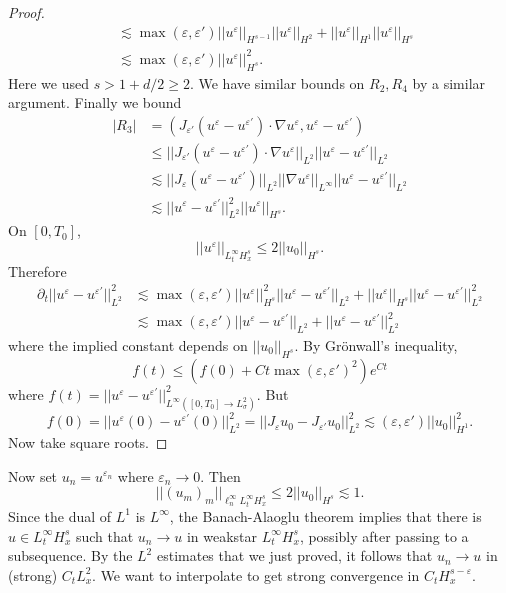 \documentclass[12pt]{book}
\theoremstyle{definition}
\begin{document}
\begin{proof}
\begin{align*}
&\lesssim \max(\varepsilon, \varepsilon') ||u^\varepsilon||_{H^{s-1}} ||u^\varepsilon||_{H^2} + ||u^\varepsilon||_{H^1} ||u^\varepsilon||_{H^s}\\
&\lesssim \max(\varepsilon, \varepsilon') ||u^\varepsilon||_{H^s}^2.
\end{align*}
Here we used $s > 1 + d/2 \geq 2$.
We have similar bounds on $R_2, R_4$ by a similar argument.
Finally we bound
\begin{align*}
|R_3| &= (J_{\varepsilon'}(u^\varepsilon - u^{\varepsilon'})\cdot \nabla u^\varepsilon,u^\varepsilon - u^{\varepsilon'}) \\
&\leq ||J_{\varepsilon'}(u^\varepsilon - u^{\varepsilon'})\cdot \nabla u^\varepsilon||_{L^2} ||u^\varepsilon - u^{\varepsilon'}||_{L^2}\\
&\lesssim ||J_\varepsilon(u^\varepsilon - u^{\varepsilon'})||_{L^2} ||\nabla u^\varepsilon||_{L^\infty} ||u^\varepsilon - u^{\varepsilon'}||_{L^2}\\
&\lesssim ||u^\varepsilon - u^{\varepsilon'}||_{L^2}^2 ||u^\varepsilon||_{H^s}.
\end{align*}
On $[0, T_0]$,
$$||u^\varepsilon||_{L^\infty_tH^s_x} \leq 2||u_0||_{H^s}.$$
Therefore
\begin{align*}
\partial_t ||u^\varepsilon - u^{\varepsilon'}||_{L^2}^2 &\lesssim \max(\varepsilon, \varepsilon') ||u^\varepsilon||_{H^s}^2 ||u^\varepsilon - u^{\varepsilon'}||_{L^2} + ||u^\varepsilon||_{H^s} ||u^\varepsilon - u^{\varepsilon'}||_{L^2}^2\\
&\lesssim \max(\varepsilon, \varepsilon')||u^\varepsilon - u^{\varepsilon'}||_{L^2} + ||u^\varepsilon - u^{\varepsilon'}||_{L^2}^2
\end{align*}
where the implied constant depends on $||u_0||_{H^s}$.
By Gr\"onwall's inequality,
$$f(t) \leq (f(0) + Ct\max(\varepsilon, \varepsilon')^2)e^{Ct}$$
where $f(t) = ||u^\varepsilon - u^{\varepsilon'}||_{L^\infty([0, T_0] \to L^2_\sigma)}^2$.
But
$$f(0) = ||u^\varepsilon(0) - u^{\varepsilon'}(0)||_{L^2}^2 = ||J_\varepsilon u_0 - J_{\varepsilon'} u_0||_{L^2}^2 \lesssim (\varepsilon, \varepsilon') ||u_0||_{H^1}^2.$$
Now take square roots.
\end{proof}

Now set $u_n = u^{\varepsilon_n}$ where $\varepsilon_n \to 0$. Then
$$||(u_m)_m||_{\ell^\infty_n L^\infty_t H^s_x} \leq 2 ||u_0||_{H^s} \lesssim 1.$$
Since the dual of $L^1$ is $L^\infty$, the Banach-Alaoglu theorem implies that there is $u \in L^\infty_t H^s_x$ such that $u_n \to u$ in weakstar $L^\infty_t H^s_x$, possibly after passing to a subsequence.
By the $L^2$ estimates that we just proved, it follows that $u_n \to u$ in (strong) $C_t L^2_x$.
We want to interpolate to get strong convergence in $C_t H^{s - \varepsilon}_x$.
\end{document}
